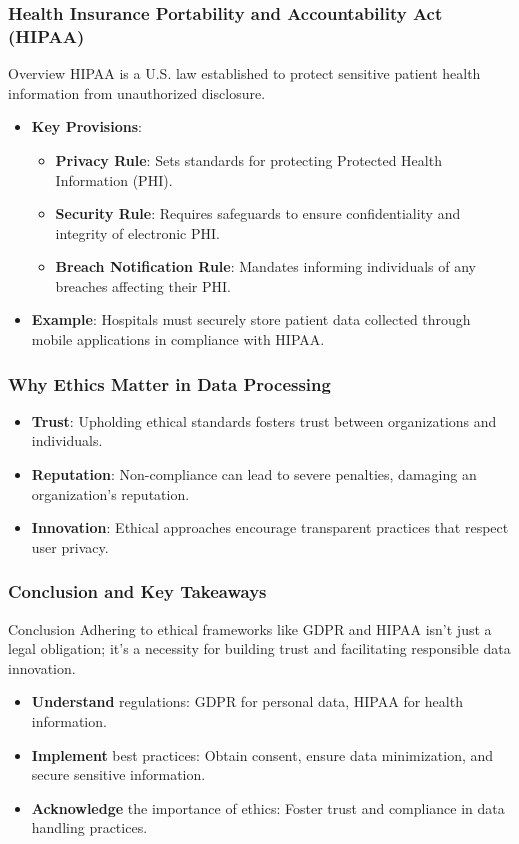 \documentclass[aspectratio=169]{beamer}
\begin{document}
\begin{frame}[fragile]
    \frametitle{Health Insurance Portability and Accountability Act (HIPAA)}
    \begin{block}{Overview}
        HIPAA is a U.S. law established to protect sensitive patient health information from unauthorized disclosure.
    \end{block}
    \begin{itemize}
        \item \textbf{Key Provisions}:
            \begin{itemize}
                \item \textbf{Privacy Rule}: Sets standards for protecting Protected Health Information (PHI).
                \item \textbf{Security Rule}: Requires safeguards to ensure confidentiality and integrity of electronic PHI.
                \item \textbf{Breach Notification Rule}: Mandates informing individuals of any breaches affecting their PHI.
            \end{itemize}
        \item \textbf{Example}: Hospitals must securely store patient data collected through mobile applications in compliance with HIPAA.
    \end{itemize}
\end{frame}

\begin{frame}[fragile]
    \frametitle{Why Ethics Matter in Data Processing}
    \begin{itemize}
        \item \textbf{Trust}: Upholding ethical standards fosters trust between organizations and individuals.
        \item \textbf{Reputation}: Non-compliance can lead to severe penalties, damaging an organization's reputation.
        \item \textbf{Innovation}: Ethical approaches encourage transparent practices that respect user privacy.
    \end{itemize}
\end{frame}

\begin{frame}[fragile]
    \frametitle{Conclusion and Key Takeaways}
    \begin{block}{Conclusion}
        Adhering to ethical frameworks like GDPR and HIPAA isn't just a legal obligation; it's a necessity for building trust and facilitating responsible data innovation.
    \end{block}
    \begin{itemize}
        \item \textbf{Understand} regulations: GDPR for personal data, HIPAA for health information.
        \item \textbf{Implement} best practices: Obtain consent, ensure data minimization, and secure sensitive information.
        \item \textbf{Acknowledge} the importance of ethics: Foster trust and compliance in data handling practices.
    \end{itemize}
\end{frame}
\end{document}

